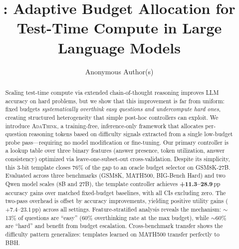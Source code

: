 \documentclass{article}
\title{\adathink{}: Adaptive Budget Allocation for\\Test-Time Compute in Large Language Models}
\author{
  Anonymous Author(s)
}
\newcommand{\adathink}{\textsc{AdaThink}}
\begin{document}
\maketitle

\begin{abstract}
Scaling test-time compute via extended chain-of-thought reasoning improves LLM accuracy on hard problems, but we show that this improvement is far from uniform: fixed budgets \emph{systematically overthink easy questions and undercompute hard ones}, creating structured heterogeneity that simple post-hoc controllers can exploit.
We introduce \adathink{}, a training-free, inference-only framework that allocates per-question reasoning tokens based on difficulty signals extracted from a single low-budget probe pass---requiring no model modification or fine-tuning.
Our primary controller is a lookup table over three binary features (answer presence, token utilization, answer consistency) optimized via leave-one-subset-out cross-validation.
Despite its simplicity, this 3-bit template closes $76\%$ of the gap to an oracle budget selector on GSM8K-27B.
Evaluated across three benchmarks (GSM8K, MATH500, BIG-Bench Hard) and two Qwen model scales (8B and 27B), the template controller achieves \textbf{+11.3--28.9}\,pp accuracy gains over matched fixed-budget baselines, with all CIs excluding zero.
The two-pass overhead is offset by accuracy improvements, yielding positive utility gains ($+7.4$--$23.1$\,pp) across all settings.
Feature-stratified analysis reveals the mechanism: $\sim$13\% of questions are ``easy'' (60\% overthinking rate at the max budget), while $\sim$60\% are ``hard'' and benefit from budget escalation.
Cross-benchmark transfer shows the difficulty pattern generalizes: templates learned on MATH500 transfer perfectly to BBH.
\end{abstract}












\appendix

\end{document}
